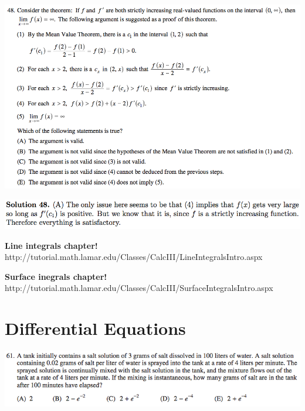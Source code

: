 \documentclass{article}
\begin{document}
\includegraphics[scale=0.5]{0568_48}

\includegraphics[scale=0.5]{0568_48s}





%


%

\textbf{Line integrals chapter!} http://tutorial.math.lamar.edu/Classes/CalcIII/LineIntegralsIntro.aspx

\textbf{Surface inegrals chapter!} http://tutorial.math.lamar.edu/Classes/CalcIII/SurfaceIntegralsIntro.aspx

\pagebreak

\section{Differential Equations}

\includegraphics[scale=0.65]{1268_61}
\end{document}
